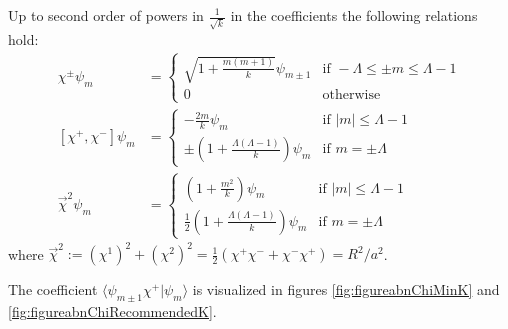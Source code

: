 \begin{proposition}%
Up to second order of powers in $\frac{1}{\sqrt{k}}$ in the coefficients the following relations hold:
\begin{align}\label{equationActionChiD2WithoutOO}
    \chi^\pm  \psi_m
        &= \begin{cases}
        \sqrt{1 + \frac{m(m+1)}{k}}  \psi_{m \pm 1} & \text{if } -\Lambda \leq \pm m \leq \Lambda -1
        \\
        0 & \text{otherwise}
        \end{cases}\\
    \label{equationCommutatorChiD2}
    [\chi^+, \chi^-]  \psi_m
        &= \begin{cases}
         -\frac{2m}{k} \psi_{m} & \text{if } |m| \leq \Lambda -1
        \\
        \pm \left( 1 + \frac{\Lambda(\Lambda-1)}{k} \right) \psi_{m} & \text{if } m = \pm \Lambda 
        \end{cases}\\
    \label{equationRChiD2}
    \vec \chi^2  \psi_m
        &= \begin{cases}
        \left( 1+ \frac{m^2}{k} \right) \psi_{m} & \text{if } |m| \leq \Lambda -1
        \\
        \frac{1}{2} \left( 1+ \frac{\Lambda(\Lambda-1)}{k} \right) \psi_{m} & \text{if } m = \pm \Lambda 
        \end{cases}
\end{align}
where $\vec \chi^2 := (\chi^1)^2 + (\chi^2)^2 = \frac{1}{2}(\chi^+\chi^- + \chi^-\chi^+)= R^2/a^2$.
\end{proposition}
The coefficient $\langle \psi_{m \pm 1} \chi^+ | \psi_{m}\rangle$ is visualized in figures \ref{fig:figureabnChiMinK} and \ref{fig:figureabnChiRecommendedK}.

